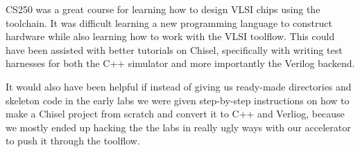 \documentclass[twocolumn]{article}
\begin{document}
CS250 was a great course for learning how to design VLSI chips using
the toolchain. It was difficult learning a new programming language to
construct hardware while also learning how to work with the VLSI
toolflow. This could have been assisted with better tutorials on
Chisel, specifically with writing test harnesses for both the C++
simulator and more importantly the Verilog backend.

It would also have been helpful if instead of giving us ready-made
directories and skeleton code in the early labs we were given
step-by-step instructions on how to make a Chisel project from scratch
and convert it to C++ and Verliog, because we mostly ended up hacking
the the labs in really ugly ways with our accelerator to push it
through the toolflow.



\end{document}
